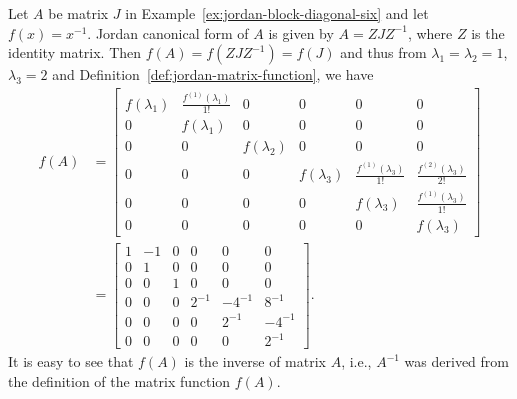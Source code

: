 \begin{Example}\label{ex:inverse-jordan-matrix-function}
{Let $A$ be matrix $J$ in Example~\ref{ex:jordan-block-diagonal-six} and let $f(x)=x^{-1}$. Jordan canonical form of $A$ is given by $A=ZJZ^{-1}$, where $Z$ is the identity matrix. Then $f(A)=f(ZJZ^{-1})=f(J)$ and thus from $\lambda_1=\lambda_2=1$, $\lambda_3=2$ and Definition~\ref{def:jordan-matrix-function}, we have}
\[
\begin{aligned}
f(A)&=\left[\begin{array}{cc|c|ccc}f(\lambda_1)&\frac{f^{(1)}(\lambda_1)}{1!}&0&0&0&0\\0&f(\lambda_1)&0&0&0&0\\\hline0&0&f(\lambda_2)&0&0&0\\\hline0&0&0&f(\lambda_3)&\frac{f^{(1)}(\lambda_3)}{1!}&\frac{f^{(2)}(\lambda_3)}{2!}\\0&0&0&0&f(\lambda_3)&\frac{f^{(1)}(\lambda_3)}{1!}\\0&0&0&0&0&f(\lambda_3)\end{array}\right]\\
&=\left[\begin{array}{cc|c|ccc}1&-1&0&0&0&0\\0&1&0&0&0&0\\\hline0&0&1&0&0&0\\\hline0&0&0&2^{-1}&-4^{-1}&8^{-1}\\0&0&0&0&2^{-1}&-4^{-1}\\0&0&0&0&0&2^{-1}\end{array}\right].
\end{aligned}
\]
{It is easy to see that $f(A)$ is the inverse of matrix $A$, i.e., $A^{-1}$ was derived from the definition of the matrix function $f(A)$.}
\end{Example}

